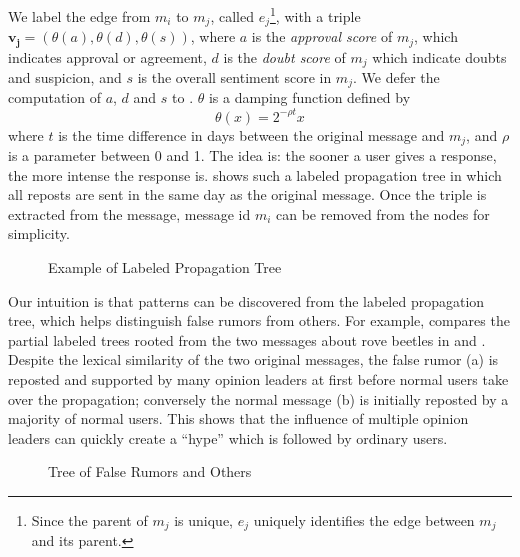 We label the edge from $m_i$ to $m_j$, called $e_{j}$\footnote{Since the
parent of $m_j$ is unique, $e_j$ uniquely identifies the edge
between $m_j$ and its parent.}, with a triple
$\boldsymbol{v_j} = (\theta(a),\theta(d),\theta(s))$,
where $a$ is the {\em approval score}
of $m_j$, which indicates approval or agreement,
$d$ is the {\em doubt score} of $m_j$ which indicate doubts and suspicion,
and $s$ is the overall sentiment score in $m_j$.
We defer the computation of $a$, $d$ and $s$ to .
$\theta$ is a damping function defined by
\begin{equation}
\theta(x) = 2^{-\rho t} x
\end{equation}
where $t$ is the time difference in days between the original message
and $m_j$, and $\rho$ is a parameter between 0 and 1.
The idea is: the sooner a user gives a response, the more intense
the response is.
 shows such a labeled propagation tree in which
all reposts are sent in the same day as the original message. Once
the triple is extracted from the message, message id $m_i$ can be removed
from the nodes for simplicity.
\begin{figure}[htb]
\centering
{}
\caption{Example of Labeled Propagation Tree}
\label{fig:ltree}
\end{figure}

Our intuition is that patterns can be discovered from
the labeled propagation tree,
which helps distinguish false rumors from others. For example,
 compares the partial labeled trees rooted from the two
messages about rove beetles in  and
. Despite the lexical similarity of the two
original messages, the false rumor (a) is reposted and supported by many
opinion leaders at first before normal users take over the propagation;
conversely the normal message (b) is initially reposted by a majority of
normal users. This shows that the influence of multiple opinion leaders can
quickly create a ``hype'' which is followed by ordinary users.

\begin{figure}[th]
\centering
{}
\caption{Tree of False Rumors and Others}
\label{fig:patterns}
\end{figure}

